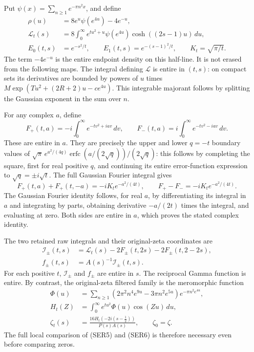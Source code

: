 \documentclass[
  10pt,
  a4paper,
]{article}
\begin{document}
Put \(\psi(x)=\sum_{n\ge1}e^{-\pi n^2x}\), and define \[
\begin{aligned}
\rho(u)&=8e^u\psi(e^{4u})-4e^{-u},\\
\mathcal L_t(s)&=8\int_0^\infty e^{tu^2+u}\psi(e^{4u})
                  \cosh((2s-1)u)\,du,\\
E_0(t,s)&=e^{-s^2/t},\qquad E_1(t,s)=e^{-(s-1)^2/t},
\qquad K_t=\sqrt{\pi/t}.
\end{aligned}\tag{SER2}
\] The term \(-4e^{-u}\) is the entire endpoint density on this
half-line. It is not erased from the following maps. The integral
defining \(\mathcal L\) is entire in \((t,s)\): on compact sets its
derivatives are bounded by powers of \(u\) times
\(M\exp(Tu^2+(2R+2)u-ce^{4u})\). This integrable majorant follows by
splitting the Gaussian exponent in the sum over \(n\).

For any complex \(a\), define \[
F_+(t,a)=-i\int_0^\infty e^{-tv^2+iav}\,dv,
\qquad
F_-(t,a)=i\int_0^\infty e^{-tv^2-iav}\,dv.
\tag{SER3}
\] These are entire in \(a\). They are precisely the upper and lower
\(q=-t\) boundary values of
\(\sqrt\pi\,e^{a^2/(4q)}\operatorname{erfc}(a/(2\sqrt q))/(2\sqrt q)\):
this follows by completing the square, first for real positive \(q\),
and continuing its entire error-function expression to
\(\sqrt q=\pm i\sqrt t\). The full Gaussian Fourier integral gives \[
F_+(t,a)+F_+(t,-a)=-iK_t e^{-a^2/(4t)},
\qquad F_+-F_-=-iK_t e^{-a^2/(4t)}.
\tag{SER4}
\] The Gaussian Fourier identity follows, for real \(a\), by
differentiating its integral in \(a\) and integrating by parts,
obtaining derivative \(-a/(2t)\) times the integral, and evaluating at
zero. Both sides are entire in \(a\), which proves the stated complex
identity.

The two retained raw integrals and their original-zeta coordinates are
\[
\begin{aligned}
\mathcal I_\pm(t,s)
 &=\mathcal L_t(s)-2F_\pm(t,2s)-2F_\pm(t,2-2s),\\
f_\pm(t,s)&=A(s)^{-1}\mathcal I_\pm(t,s).
\end{aligned}\tag{SER5}
\] For each positive \(t\), \(\mathcal I_\pm\) and \(f_\pm\) are entire
in \(s\). The reciprocal Gamma function is entire. By contrast, the
original-zeta filtered family is the meromorphic function \[
\begin{aligned}
\Phi(u)&=\sum_{n\ge1}
 (2\pi^2n^4e^{9u}-3\pi n^2e^{5u})e^{-\pi n^2e^{4u}},\\
H_t(Z)&=\int_0^\infty e^{tu^2}\Phi(u)\cos(Zu)\,du,\\
\zeta_t(s)&=\frac{16H_t(-2i(s-\tfrac12))}{P(s)A(s)},
\qquad \zeta_0=\zeta.
\end{aligned}\tag{SER6}
\] The full local comparison of (SER5) and (SER6) is therefore necessary
even before comparing zeros.
\end{document}
